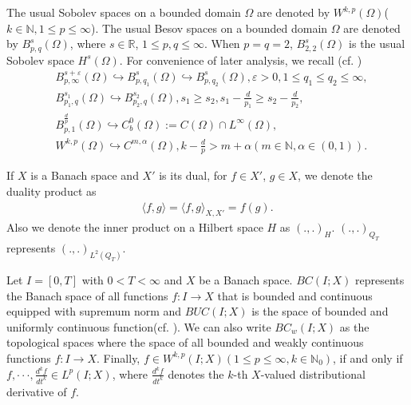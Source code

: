 \documentclass[reqno,a4paper,11pt]{amsart}
\theoremstyle{plain}
\numberwithin{equation}{section}
\renewcommand{\d}{\mathrm{d}}
\begin{document}
The usual Sobolev spaces on a bounded domain $\Omega$ are denoted by $W^{k,p}(\Omega)$($k\in \mathbb{N}, 1\leq p\leq\infty$). The usual Besov spaces on a bounded domain $\Omega$ are denoted by $B_{p,q}^{s}(\Omega)$, where $s\in \mathbb{R}$, $1\leq p,q\leq\infty$. When $p=q=2$,  $B_{2,2}^{s}(\Omega)$ is the usual Sobolev space $H^{s}(\Omega)$. For convenience of later analysis, we recall (cf. \cite{ELC,SY})
\begin{align}
	& \label{BB1} B_{p,\infty}^{s+\varepsilon}(\Omega)\hookrightarrow B_{p,q_{1}}^{s}(\Omega)\hookrightarrow B_{p,q_{2}}^{s}(\Omega), \varepsilon>0, 1\leq q_{1}\leq q_{2}\leq\infty,
	\\& \label{BB2}B_{p_{1},q}^{s_{1}}(\Omega)\hookrightarrow B_{p_{2},q}^{s_{2}}(\Omega), s_{1} \geq s_{2}, s_{1}-\frac{d}{p_{1}}\geq s_{2}-\frac{d}{p_{2}},
	\\& \label{BB3}B_{p,1}^{\frac{d}{p}}(\Omega)\hookrightarrow C_{b}^{0}(\Omega):=C(\Omega)\cap L^{\infty}(\Omega),
	\\& \label{BB4}W^{k,p}(\Omega)\hookrightarrow C^{m,\alpha}(\Omega), k-\frac{d}{p}>m+\alpha(m\in\mathbb{N},\alpha\in (0,1)).
\end{align}




If $X$ is a Banach space and $X'$ is its dual, for $f\in X'$, $g\in X$, we denote the duality product as
\begin{align*}
	\langle f,g \rangle=\langle f,g \rangle_{X,X'}=f(g).
\end{align*}
Also we denote the inner product on a Hilbert space $H$ as $(.,.)_{H}$. $(.,.)_{Q_{T}}$ represents $(.,.)_{L^{2}(Q_{T})}$.








Let $I=[0,T]$ with $0<T<\infty$ and  $X$ be a Banach space.  $BC(I;X)$ represents the Banach space  of all functions $f:I\rightarrow X$ that is  bounded and continuous equipped with supremum norm and $BUC(I;X)$ is the space  of bounded and uniformly continuous function(cf. \cite{AH2}). We can also write $BC_{w}(I;X)$ as the topological spaces where the space of all bounded and weakly continuous functions $f:I\rightarrow X$. Finally, $f\in W^{k,p}(I; X)(1\leq p \leq\infty, k\in \mathbb{N}_{0})$, if and only if
$f,\cdot\cdot\cdot,\frac{d^{k}f}{dt^{k}}\in  L^{p}(I; X)$, where $\frac{d^{k}f}{dt^{k}}$  denotes the $k$-th $X$-valued distributional derivative of $f$.
\end{document}
